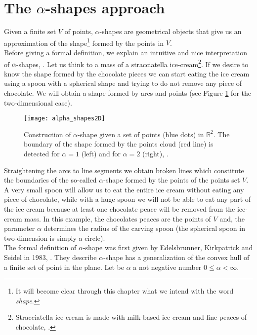 \section{The $\alpha$-shapes approach}\label{sec:alpha-shapes}
Given a finite set $V$ of points, $\alpha$-shapes are geometrical objects that give us an approximation of the shape\footnote{It will become clear through this chapter what we intend with the word \textit{shape}.} formed by the points in $V$.\\ \indent
Before giving a formal definition, we explain an intuitive and nice interpretation of $\alpha$-shapes, \cite{lucieer2004alpha}. 
Let us think to a mass of a stracciatella ice-cream\footnote{Stracciatella ice cream is made with milk-based ice-cream and fine peaces of chocolate, \cite{Wiki3}.}. If we desire to know the shape formed by the chocolate pieces we can start eating the ice cream using a spoon with a spherical shape and trying to do not remove any piece of chocolate. 
We will obtain a shape formed by arcs and points (see Figure \ref{fig:shape2d} for the two-dimensional case).
\begin{figure}[htbp]\label{fig:shape2d}
\begin{center}
\texttt{[image: alpha\_shapes2D]}
\label{fig:shape}
\caption{Construction of $\alpha$-shape given a set of points (blue dots) in $\mathbb{R}^2$. The boundary of the shape formed by the points cloud (red line) is detected for $\alpha = 1$ (left) and for $\alpha=2$ (right), \cite{sabel2017application}.}
\label{fig:shape2d}
\end{center}
\end{figure}
Straightening the arcs to line segments we obtain broken lines which constitute the boundaries of the so-called $\alpha$-shape formed by the points of the points set $V$. 
A very small spoon will allow us to eat the entire ice cream without eating any piece of chocolate, while with a huge spoon we will not be able to eat any part of the ice cream because at least one chocolate peace will be removed from the ice-cream mass. In this example, the chocolates peaces are the points of $V$ and, the parameter $\alpha$ determines the radius of the carving spoon (the spherical spoon in two-dimension is simply a circle).\\ \indent 
The formal definition of $\alpha$-shape was first given by Edelsbrunner, Kirkpatrick and Seidel in 1983, \cite{edelsbrunner1983shape}. They describe $\alpha$-shape has a generalization of the convex hull of a finite set of point in the plane. Let be $\alpha$ a not negative number $0\leq\alpha<\infty$. 
